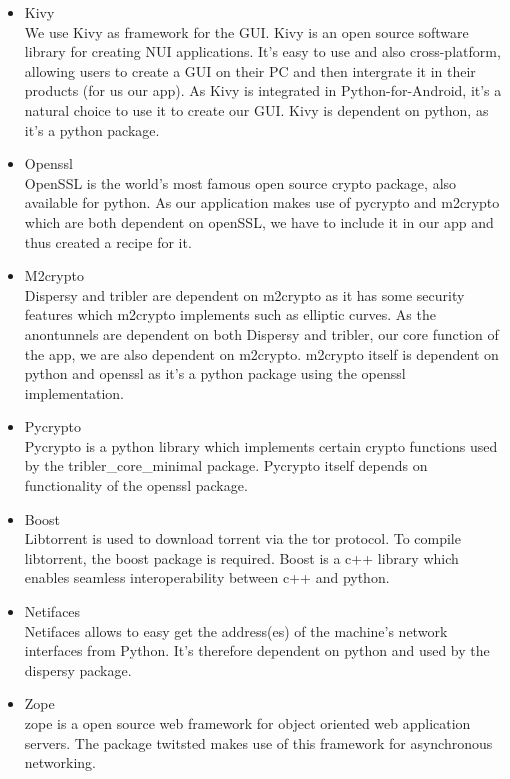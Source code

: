 \documentclass{article}
\begin{document}
	\begin{itemize}
	
		\item Kivy\\
		We use Kivy as framework for the GUI. Kivy is an open source software library for creating NUI applications. It's easy to use and also cross-platform, allowing users to create a GUI on their PC and then intergrate it in their products (for us our app). As Kivy is integrated in Python-for-Android, it's a natural choice to use it to create our GUI. Kivy is dependent on python, as it's a python package. 
	
		\item Openssl\\
		OpenSSL is the world's most famous open source crypto package, also available for python. As our application makes use of pycrypto and m2crypto which are both dependent on openSSL, we have to include it in our app and thus created a recipe for it. 
	
		\item M2crypto\\
		Dispersy and tribler are dependent on m2crypto as it has some security features which m2crypto implements such as elliptic curves. As the anontunnels are dependent on both Dispersy and tribler, our core function of the app, we are also dependent on m2crypto. m2crypto itself is dependent on python and openssl as it's a python package using the openssl implementation.
	
		\item Pycrypto\\
		Pycrypto is a python library which implements certain crypto functions used by the tribler\_core\_minimal package. Pycrypto itself depends on functionality of the openssl package.
	
		\item Boost\\
		Libtorrent is used to download torrent via the tor protocol. To compile libtorrent, the boost package is required. Boost is a c++ library which enables seamless interoperability between c++ and python.
	
		\item Netifaces\\
		Netifaces allows to easy get the address(es) of the machine's network interfaces from Python. It's therefore dependent on python and used by the dispersy package.
	
		\item Zope\\
		zope is a open source web framework for object oriented web application servers. The package twitsted makes use of this framework for asynchronous networking.
	

\end{itemize}
\end{document}
